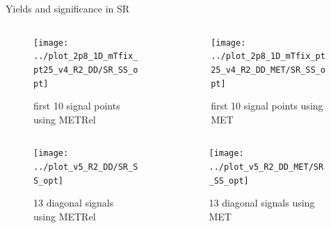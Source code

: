 \documentclass[mathserif,serif]{beamer}
\begin{document}
\begin{frame}{Yields and significance in SR}
\begin{columns}

\begin{column}{0.4\textwidth}
\begin{figure}
\texttt{[image: ../plot\_2p8\_1D\_mTfix\_pt25\_v4\_R2\_DD/SR\_SS\_opt]}
\caption{\tiny first 10 signal points using METRel}
\end{figure}
\end{column}

\begin{column}{0.4\textwidth}
\begin{figure}
\texttt{[image: ../plot\_2p8\_1D\_mTfix\_pt25\_v4\_R2\_DD\_MET/SR\_SS\_opt]}
\caption{\tiny first 10 signal points using MET}
\end{figure}
\end{column}

\end{columns}

\begin{columns}

\begin{column}{0.4\textwidth}
\begin{figure}
\texttt{[image: ../plot\_v5\_R2\_DD/SR\_SS\_opt]}
\caption{\tiny 13 diagonal signals using METRel}
\end{figure}
\end{column}

\begin{column}{0.4\textwidth}
\begin{figure}
\texttt{[image: ../plot\_v5\_R2\_DD\_MET/SR\_SS\_opt]}
\caption{\tiny 13 diagonal signals using MET}
\end{figure}
\end{column}

\end{columns}

\end{frame}

\end{document}
